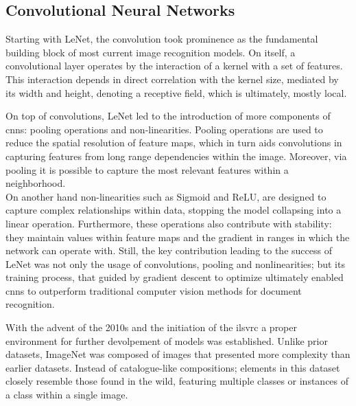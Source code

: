 \subsection{Convolutional Neural Networks}
\label{rel:sub_cnn}
Starting with LeNet, the convolution took prominence as the fundamental building block 
of most current image recognition models. On itself, a convolutional layer operates by the 
interaction of a kernel with a set of features. This interaction depends in 
direct correlation with the kernel size, mediated by its width and height, denoting a receptive field,
which is ultimately, mostly local. 
%

\noindent On top of convolutions, LeNet led to the introduction of more components of \glspl{cnn}: 
pooling operations and non-linearities. Pooling operations are used to reduce the spatial 
resolution of feature maps, which in turn aids convolutions in capturing features from long 
range dependencies within the image. Moreover, via pooling it is possible to capture the most 
relevant features within a neighborhood.\\
On another hand non-linearities such as Sigmoid and ReLU, are designed to capture complex 
relationships within data, stopping the model collapsing into a linear operation. Furthermore, these 
operations also contribute with stability: they maintain values within feature maps and the gradient 
in ranges in which the network can operate with. %
Still, the key contribution leading to the success of LeNet was not only the usage of 
convolutions, pooling and nonlinearities; but its training process, that guided by gradient descent 
to optimize ultimately enabled \glspl{cnn} to outperform traditional computer vision methods for 
document recognition. 



\noindent With the advent of the 2010s and the initiation of the \gls{ilsvrc} \autocite{ILSVRC15} 
a proper environment for further devolpement of models was established. Unlike prior datasets, 
ImageNet was composed of images that presented more complexity than earlier datasets. Instead 
of catalogue-like compositions; elements in this dataset closely resemble those found 
in the wild, featuring multiple classes or instances of a class within a single image.

